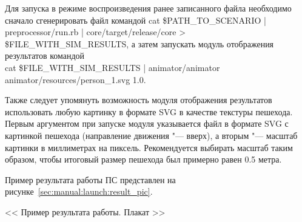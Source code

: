 Для запуска в режиме воспроизведения ранее записанного файла необходимо сначало сгенерировать файл командой
cat \$PATH\_TO\_SCENARIO \-|\- preprocessor/run.rb \-|\- core/target/release/core \->\- \$FILE\_WITH\_SIM\_RESULTS,
а затем запускать модуль отображения результатов командой \\
cat \$FILE\_WITH\_SIM\_RESULTS \-|\- animator/animator \\ animator/resources/person\_1.svg 1.0.

Также следует упомянуть возможность модуля отображения результатов использовать любую картинку в формате SVG в качестве текстуры пешехода.
Первым аргументом при запуске модуля указывается файл в формате SVG с картинкой пешехода (направление движения "--- вверх), а вторым "--- масштаб картинки в миллиметрах на пиксель.
Рекомендуется выбирать масштаб таким образом, чтобы итоговый размер пешехода был примерно равен 0.5 метра.

Пример результата работы ПС представлен на рисунке~\ref{sec:manual:launch:result_pic}.

<< Пример результата работы. Плакат >>
